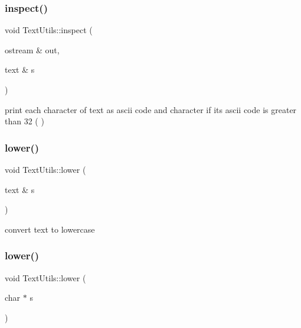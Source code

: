 \subsubsection{\texorpdfstring{inspect()}{inspect()}}
{\footnotesize\ttfamily void Text\+Utils\+::inspect (\begin{DoxyParamCaption}\item[{ostream \&}]{out,  }\item[{text \&}]{s }\end{DoxyParamCaption})\hspace{0.3cm}{\ttfamily [static]}}

print each character of text as ascii code and character if its ascii code is greater than 32 (\textquotesingle{} \textquotesingle{}) \mbox{\label{classez_1_1essential_1_1TextUtils_a09ae87eaf31c8c0be44f616b560b9ebb}} 
\subsubsection{\texorpdfstring{lower()}{lower()}\hspace{0.1cm}{\footnotesize\ttfamily [1/2]}}
{\footnotesize\ttfamily void Text\+Utils\+::lower (\begin{DoxyParamCaption}\item[{text \&}]{s }\end{DoxyParamCaption})\hspace{0.3cm}{\ttfamily [static]}}

convert text to lowercase \mbox{\label{classez_1_1essential_1_1TextUtils_ab751dfb12e15915bfc23039587f11cd6}} 
\subsubsection{\texorpdfstring{lower()}{lower()}\hspace{0.1cm}{\footnotesize\ttfamily [2/2]}}
{\footnotesize\ttfamily void Text\+Utils\+::lower (\begin{DoxyParamCaption}\item[{char $\ast$}]{s }\end{DoxyParamCaption})\hspace{0.3cm}{\ttfamily [static]}}

